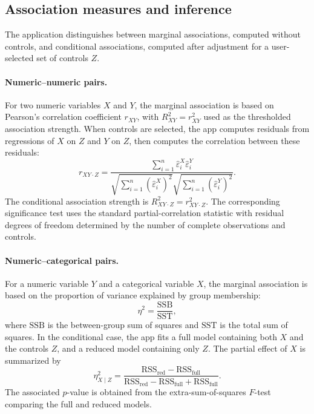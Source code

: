 \documentclass[11pt,a4paper]{article}
\begin{document}
\subsection{Association measures and inference}

The application distinguishes between marginal associations, computed without controls, and conditional associations, computed after adjustment for a user-selected set of controls $Z$.

\paragraph{Numeric--numeric pairs.}
For two numeric variables $X$ and $Y$, the marginal association is based on Pearson's correlation coefficient $r_{XY}$, with $R^2_{XY}=r_{XY}^2$ used as the thresholded association strength. When controls are selected, the app computes residuals from regressions of $X$ on $Z$ and $Y$ on $Z$, then computes the correlation between these residuals:
\[
r_{XY\cdot Z} =
\frac{\sum_{i=1}^n \hat{\varepsilon}^X_i \hat{\varepsilon}^Y_i}
{\sqrt{\sum_{i=1}^n(\hat{\varepsilon}^X_i)^2}\sqrt{\sum_{i=1}^n(\hat{\varepsilon}^Y_i)^2}}.
\]
The conditional association strength is $R^2_{XY\cdot Z}=r_{XY\cdot Z}^2$. The corresponding significance test uses the standard partial-correlation statistic with residual degrees of freedom determined by the number of complete observations and controls.

\paragraph{Numeric--categorical pairs.}
For a numeric variable $Y$ and a categorical variable $X$, the marginal association is based on the proportion of variance explained by group membership:
\[
\eta^2 = \frac{\mathrm{SSB}}{\mathrm{SST}},
\]
where $\mathrm{SSB}$ is the between-group sum of squares and $\mathrm{SST}$ is the total sum of squares. In the conditional case, the app fits a full model containing both $X$ and the controls $Z$, and a reduced model containing only $Z$. The partial effect of $X$ is summarized by
\[
\eta^2_{X\mid Z} =
\frac{\mathrm{RSS}_{\mathrm{red}}-\mathrm{RSS}_{\mathrm{full}}}
{\mathrm{RSS}_{\mathrm{red}}-\mathrm{RSS}_{\mathrm{full}}+\mathrm{RSS}_{\mathrm{full}}}.
\]
The associated $p$-value is obtained from the extra-sum-of-squares $F$-test comparing the full and reduced models.
\end{document}
